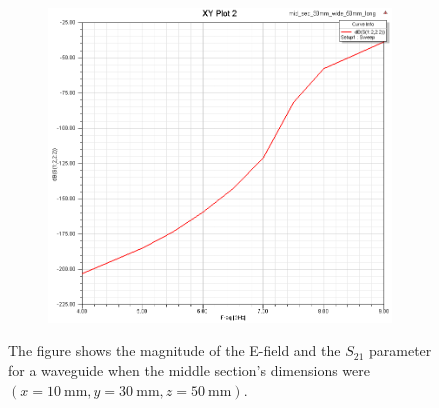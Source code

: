 \documentclass[12pt,a4paper]{article}
\begin{document}
\begin{figure}
\begin{subfigure}[b]{0.49\textwidth}
    \label{fig:2_3050_9ghz}
  \end{subfigure}
  \begin{subfigure}[b]{0.49\textwidth}
    \includegraphics[width=\textwidth]{./mid_sec_30mm_wide_50mm_long/s1222.png}
    \label{fig:2_3050_s1222}
  \end{subfigure}
  \caption{The figure shows the magnitude of the E-field and the $S_{21}$ parameter for a waveguide when the middle section's dimensions were $(x=\SI{10}{\milli\metre}, y=\SI{30}{\milli\metre}, z=\SI{50}{\milli\metre})$.}
  \label{fig:task2_3050}
\end{figure}
\end{document}
